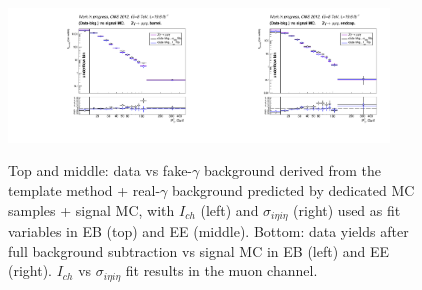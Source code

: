 \begin{figure}[htb]
\begin{center}
\includegraphics[width=0.45\textwidth]{../figs/figs_v11/MUON_ZGamma/PrepareYields/c_BkgSubtrDATAvsSIGMC_c_MUON_ZGamma__UNblind__Barrel__phoEt.pdf}\includegraphics[width=0.45\textwidth]{../figs/figs_v11/MUON_ZGamma/PrepareYields/c_BkgSubtrDATAvsSIGMC_c_MUON_ZGamma__UNblind__Endcap__phoEt.pdf}\\
  \caption{Top and middle: data vs fake-$\gamma$ background derived from the template method + real-$\gamma$ background predicted by dedicated MC samples + signal MC, with $I_{ch}$ (left) and $\sigma_{i\eta i\eta}$ (right) used as fit variables in EB (top) and EE (middle). Bottom: data yields after full background subtraction vs signal MC in EB (left) and EE (right). $I_{ch}$ vs $\sigma_{i\eta i\eta}$ fit results in the muon channel.}
  \label{fig:DDvsMC_Zg_Data_MUON}
  \end{center}
\end{figure}


